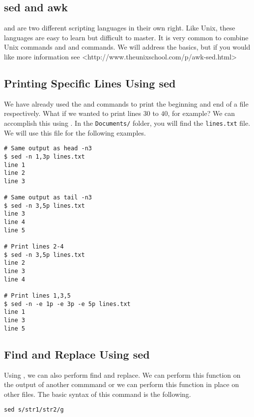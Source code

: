 \subsection*{sed and awk} %

 and  are two different scripting languages in their own right.
Like Unix, these languages are easy to learn but difficult to master.
It is very common to combine Unix commands and  and  commands.
We will address the basics, but if you would like more information see <http://www.theunixschool.com/p/awk-sed.html>

\subsection*{Printing Specific Lines Using sed} %

We have already used the  and  commands to print the beginning and end of a file respectively.
What if we wanted to print lines $30$ to $40$, for example?
We can accomplish this using .
In the \texttt{Documents/} folder, you will find the \texttt{lines.txt} file.
We will use this file for the following examples.

\begin{lstlisting}
# Same output as head -n3
$ sed -n 1,3p lines.txt
line 1
line 2
line 3

# Same output as tail -n3
$ sed -n 3,5p lines.txt
line 3
line 4
line 5

# Print lines 2-4
$ sed -n 3,5p lines.txt
line 2
line 3
line 4

# Print lines 1,3,5
$ sed -n -e 1p -e 3p -e 5p lines.txt
line 1
line 3
line 5
\end{lstlisting}

\subsection*{Find and Replace Using sed} %

Using , we can also perform find and replace.
We can perform this function on the output of another commmand or we can perform this function in place on other files.
The basic syntax of this  command is the following.

\begin{lstlisting}
sed s/str1/str2/g
\end{lstlisting}

